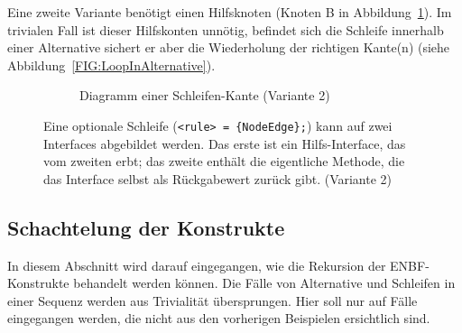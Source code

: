 \documentclass[../InterneDSLs.tex]{subfiles}
\begin{document}
Eine zweite Variante benötigt einen Hilfsknoten (Knoten B in Abbildung~\ref{FIG:DiagramLoopNodeAlt}). Im trivialen Fall ist dieser Hilfskonten unnötig, befindet sich die Schleife innerhalb einer Alternative sichert er aber die Wiederholung der richtigen Kante(n) (siehe Abbildung~\ref{FIG:LoopInAlternative}).
\begin{figure}[ht]
\centering
  \begin{subfigure}[c]{0.49\textwidth}
    \caption{Diagramm einer Schleifen-Kante (Variante 2)}
    \label{FIG:DiagramLoopNodeAlt}
  \end{subfigure}
  \begin{subfigure}[c]{0.49\textwidth}
    
  \end{subfigure}
  \caption[Abbildung einer optionalen Schleife (Variante 2)]{Eine optionale Schleife (\texttt{<rule> = \{NodeEdge\};}) kann auf zwei Interfaces abgebildet werden. Das erste ist ein Hilfs-Interface, das vom zweiten erbt; das zweite enthält die eigentliche Methode, die das Interface selbst als Rückgabewert zurück gibt. (Variante 2)}
  \label{FIG:LoopNodeAlt}
\end{figure}


\subsection{Schachtelung der Konstrukte}
In diesem Abschnitt wird darauf eingegangen, wie die Rekursion der ENBF-Konstrukte behandelt werden können. Die Fälle von Alternative und Schleifen in einer Sequenz werden aus Trivialität übersprungen. Hier soll nur auf Fälle eingegangen werden, die nicht aus den vorherigen Beispielen ersichtlich sind.
\end{document}
